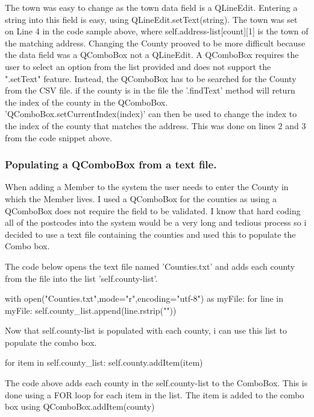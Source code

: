 The town was easy to change as the town data field is a QLineEdit. Entering a string into this field is easy, using QLineEdit.setText(string). The town was set on Line 4 in the code sample above, where self.address-list[count][1] is the town of the matching address. Changing the County prooved to be more difficult because the data field was a QComboBox not a QLineEdit. A QComboBox requires the user to select an option from the list provided and does not support the ".setText" feature. Instead, the QComboBox has to be searched for the County from the CSV file. if the county is in the file the '.findText' method will return the index of the county in the QComboBox. 'QComboBox.setCurrentIndex(index)' can then be used to change the index to the index of the county that matches the address. This was done on lines 2 and 3 from the code snippet above.

\subsubsection{Populating a QComboBox from a text file.}

When adding a Member to the system the user needs to enter the County in which the Member lives. I used a QComboBox for the counties as using a QComboBox does not require the field to be validated. I know that hard coding all of the postcodes into the system would be a very long and tedious process so i decided to use a text file containing the counties and used this to populate the Combo box.

The code below opens the text file named 'Counties.txt' and adds each county from the file into the list 'self.county-list'.

\begin{python}
with open("Counties.txt",mode="r",encoding="utf-8") as myFile:
                    for line in myFile:
                        self.county_list.append(line.rstrip("\n"))
\end{python}

Now that self.county-list is populated with each county, i can use this list to populate the combo box.

\begin{python}
for item in self.county_list:
                        self.county.addItem(item)
\end{python}

The code above adds each county in the self.county-list to the ComboBox. This is done using a FOR loop for each item in the list. The item is added to the combo box using QComboBox.addItem(county)

